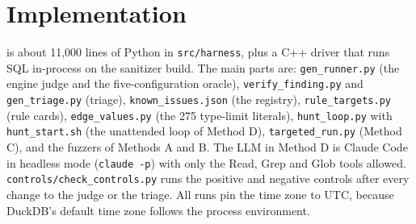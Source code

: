 \section{Implementation}
\label{sec:implementation}

\tool is about 11{,}000 lines of Python in \texttt{src/harness}, plus a C++ driver that runs SQL in-process on the
sanitizer build. The main parts are: \texttt{gen\_runner.py} (the engine judge and the five-configuration oracle),
\texttt{verify\_finding.py} and \texttt{gen\_triage.py} (triage), \texttt{known\_issues.json} (the registry),
\texttt{rule\_targets.py} (rule cards), \texttt{edge\_values.py} (the 275 type-limit literals),
\texttt{hunt\_loop.py} with \texttt{hunt\_start.sh} (the unattended loop of Method D), \texttt{targeted\_run.py}
(Method C), and the fuzzers of Methods A and B. The LLM in Method D is Claude Code in headless mode
(\texttt{claude -p}) with only the Read, Grep and Glob tools allowed.
\texttt{controls/check\_controls.py} runs the positive and negative controls after every change to the judge or the
triage. All runs pin the time zone to UTC, because DuckDB's default time zone follows the process environment.
